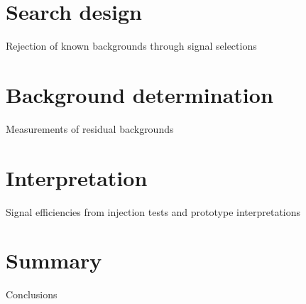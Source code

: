 \documentclass[12pt]{article}
\begin{document}
\section{Search design}
\label{sec:search}

Rejection of known backgrounds through signal selections

\section{Background determination}

Measurements of residual backgrounds

\section{Interpretation}

Signal efficiencies from injection tests and prototype interpretations

\section{Summary}

Conclusions
\end{document}
